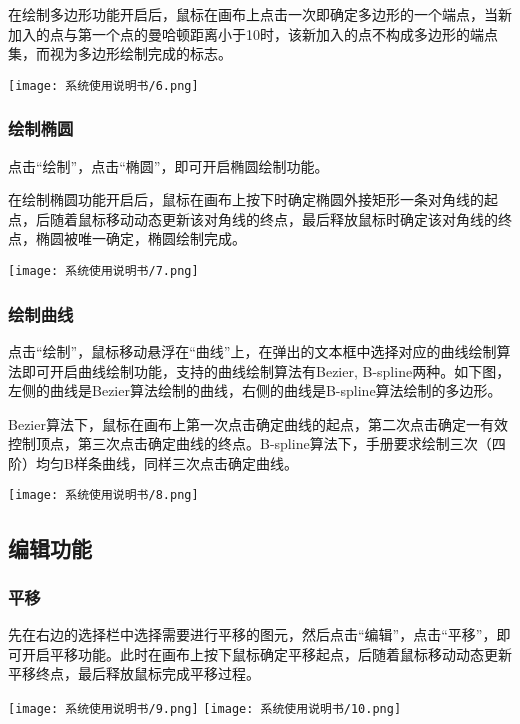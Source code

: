 \documentclass{article}
\begin{document}
		在绘制多边形功能开启后，鼠标在画布上点击一次即确定多边形的一个端点，当新加入的点与第一个点的曼哈顿距离小于10时，该新加入的点不构成多边形的端点集，而视为多边形绘制完成的标志。
		\begin{center}
			\texttt{[image: 系统使用说明书/6.png]}
		\end{center}
	
		\subsubsection{绘制椭圆}
		点击“绘制”，点击“椭圆”，即可开启椭圆绘制功能。
		
		在绘制椭圆功能开启后，鼠标在画布上按下时确定椭圆外接矩形一条对角线的起点，后随着鼠标移动动态更新该对角线的终点，最后释放鼠标时确定该对角线的终点，椭圆被唯一确定，椭圆绘制完成。
		\begin{center}
			\texttt{[image: 系统使用说明书/7.png]}
		\end{center}
		
		\subsubsection{绘制曲线}
		点击“绘制”，鼠标移动悬浮在“曲线”上，在弹出的文本框中选择对应的曲线绘制算法即可开启曲线绘制功能，支持的曲线绘制算法有Bezier, B-spline两种。如下图，左侧的曲线是Bezier算法绘制的曲线，右侧的曲线是B-spline算法绘制的多边形。
		
		Bezier算法下，鼠标在画布上第一次点击确定曲线的起点，第二次点击确定一有效控制顶点，第三次点击确定曲线的终点。B-spline算法下，手册要求绘制三次（四阶）均匀B样条曲线，同样三次点击确定曲线。
		\begin{center}
			\texttt{[image: 系统使用说明书/8.png]}
		\end{center}
	
		\subsection{编辑功能}
		\subsubsection{平移}
		先在右边的选择栏中选择需要进行平移的图元，然后点击“编辑”，点击“平移”，即可开启平移功能。此时在画布上按下鼠标确定平移起点，后随着鼠标移动动态更新平移终点，最后释放鼠标完成平移过程。
		\begin{center}
			\texttt{[image: 系统使用说明书/9.png]}
			\texttt{[image: 系统使用说明书/10.png]}
		\end{center}
	
\end{document}
